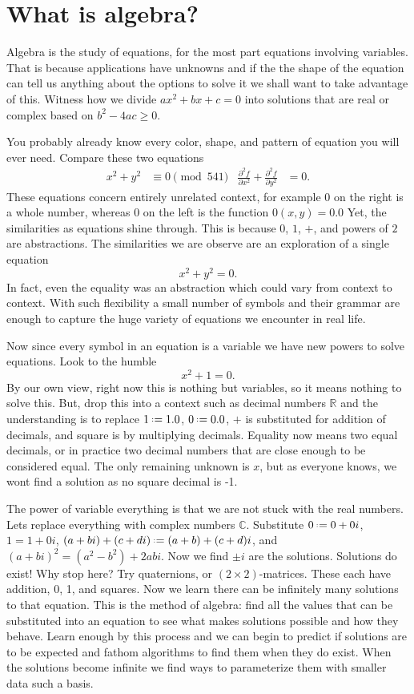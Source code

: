 \chapter{What is algebra?}

Algebra is the study of equations, for the most part equations involving variables.
That is because applications have unknowns and if the
the shape of the equation can tell us anything about the 
options to solve it we shall want to take advantage of this.
Witness how we divide $ax^2+bx+c=0$ into solutions that are 
real or complex based on $b^2-4ac\geq 0$.  

You probably already know every color, shape, and pattern of 
equation you will ever need.  Compare these two equations
\begin{align*}
    x^2+y^2 & \equiv 0 \pmod{541} 
    & 
    \frac{\partial^2 f}{\partial x^2}+\frac{\partial^2 f}{\partial y^2} & =0.
\end{align*}
These equations concern entirely unrelated context, for example $0$ on the right 
is a whole number, whereas 0 on the left is the function $0(x,y)=0.0$
Yet, the similarities as equations shine through.  This is because $0$, $1$, $+$,
and  powers of $2$ are abstractions.  The similarities we are observe are 
an exploration of a single equation
\[
    x^2+y^2=0.
\]
In fact, even the equality was an abstraction which could vary from context to context.
With such flexibility a small number of symbols and their grammar are enough to capture 
the huge variety of equations we encounter in real life.

Now since every symbol in an equation is a variable we have new powers 
to solve equations.  Look to the humble 
\[
    x^2+1=0.
\]
By our own view, right now this is nothing but variables, so it means nothing to
solve this.  But, drop this into a context such as decimal numbers $\mathbb{R}$
and the understanding is to replace $1\defeq 1.0$, $0\defeq 0.0$, $+$ is
substituted for addition of decimals, and square is by multiplying decimals.
Equality now means two equal decimals, or in practice two decimal numbers that are close enough 
to be considered equal.  The only remaining unknown is $x$, but as everyone 
knows, we wont find a solution as no square decimal is -1.

The power of variable everything is that we are not stuck with the real numbers.
Lets replace everything with complex numbers $\mathbb{C}$. Substitute $0\defeq
0+0i$, $1=1+0i$, $(a+bi)+(c+di)\defeq (a+b)+(c+d)i$, and
$(a+bi)^2=(a^2-b^2)+2abi$.  Now we find $\pm i$ are the solutions. Solutions do
exist!  Why stop here? Try quaternions, or $(2\times 2)$-matrices.  These each
have addition, 0, 1, and squares.  Now we learn there can be infinitely many
solutions to that equation.  This is the method of algebra: find all the values 
that can be substituted into an equation to see what makes solutions possible and 
how they behave.  Learn enough by this process and we can begin to predict 
if solutions are to be expected and fathom algorithms to find them when they do exist.
When the solutions become infinite we find ways to parameterize them with smaller 
data such a basis.


